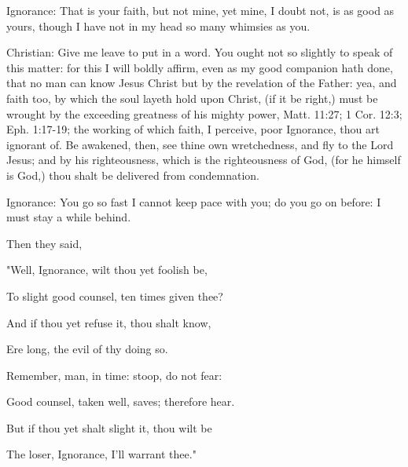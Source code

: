 Ignorance: That is your faith, but not mine, yet mine, I doubt not, is
as good as yours, though I have not in my head so many whimsies as you.

Christian: Give me leave to put in a word. You ought not so slightly to
speak of this matter: for this I will boldly affirm, even as my good
companion hath done, that no man can know Jesus Christ but by the
revelation of the Father: yea, and faith too, by which the soul layeth
hold upon Christ, (if it be right,) must be wrought by the exceeding
greatness of his mighty power, Matt. 11:27; 1 Cor. 12:3; Eph. 1:17-19;
the working of which faith, I perceive, poor Ignorance, thou art
ignorant of. Be awakened, then, see thine own wretchedness, and fly to
the Lord Jesus; and by his righteousness, which is the righteousness of
God, (for he himself is God,) thou shalt be delivered from
condemnation.

Ignorance: You go so fast I cannot keep pace with you; do you go on
before: I must stay a while behind.

Then they said,


"Well, Ignorance, wilt thou yet foolish be,

To slight good counsel, ten times given thee?

And if thou yet refuse it, thou shalt know,

Ere long, the evil of thy doing so.

Remember, man, in time: stoop, do not fear:

Good counsel, taken well, saves; therefore hear.

But if thou yet shalt slight it, thou wilt be

The loser, Ignorance, I'll warrant thee."
